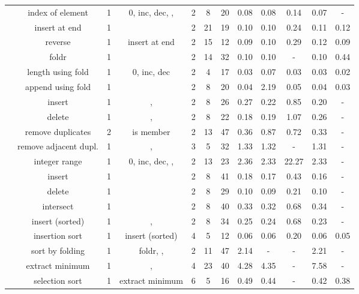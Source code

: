 \documentclass[10pt,preprint]{sigplanconf-pldi16}
\theoremstyle{definition}
\begin{document}
\begin{table*}[!htbp]
\begin{center}
{\begin{tabular}{@{} r|c| cccc | cccccc @{}}
 & index of element & 1 & 0, inc, dec, ,  & 2 & 8 & 20 & 0.08 & 0.08 & 0.14 & 0.07 & - \\
 & insert at end & 1 &  & 2 & 21 & 19 & 0.10 & 0.10 & 0.24 & 0.11 & 0.12 \\
 & reverse & 1 & insert at end & 2 & 15 & 12 & 0.09 & 0.10 & 0.29 & 0.12 & 0.09 \\
 & foldr & 1 &  & 2 & 14 & 32 & 0.10 & 0.10 & - & 0.10 & 0.44 \\
 & length using fold & 1 & 0, inc, dec & 2 & 4 & 17 & 0.03 & 0.07 & 0.03 & 0.03 & 0.02 \\
 & append using fold & 1 &  & 2 & 8 & 20 & 0.04 & 2.19 & 0.05 & 0.04 & 0.03 \\
\hline\multirow{5}{*}{\parbox{1cm}{\vspace{-0.85\baselineskip}}} & insert & 1 & ,  & 2 & 8 & 26 & 0.27 & 0.22 & 0.85 & 0.20 & - \\
 & delete & 1 & ,  & 2 & 8 & 22 & 0.18 & 0.19 & 1.07 & 0.26 & - \\
 & remove duplicates & 2 & is member & 2 & 13 & 47 & 0.36 & 0.87 & 0.72 & 0.33 & - \\
 & remove adjacent dupl. & 1 & ,  & 3 & 5 & 32 & 1.33 & 1.32 & - & 1.31 & - \\
 & integer range & 1 & 0, inc, dec, ,  & 2 & 13 & 23 & 2.36 & 2.33 & 22.27 & 2.33 & - \\
\hline\multirow{3}{*}{\parbox{1cm}{\vspace{-0.85\baselineskip}}} & insert & 1 &  & 2 & 8 & 41 & 0.18 & 0.17 & 0.43 & 0.16 & - \\
 & delete & 1 &  & 2 & 8 & 29 & 0.10 & 0.09 & 0.21 & 0.10 & - \\
 & intersect & 1 &  & 2 & 8 & 40 & 0.33 & 0.32 & 0.68 & 0.34 & - \\
\hline\multirow{11}{*}{\parbox{1cm}{\vspace{-0.85\baselineskip}}} & insert (sorted) & 1 & ,  & 2 & 8 & 34 & 0.25 & 0.24 & 0.68 & 0.23 & - \\
 & insertion sort & 1 & insert (sorted) & 4 & 5 & 12 & 0.06 & 0.06 & 0.20 & 0.06 & 0.05 \\
 & sort by folding & 1 & foldr, ,  & 2 & 11 & 47 & 2.14 & - & - & 2.21 & - \\
 & extract minimum & 1 & ,  & 4 & 23 & 40 & 4.28 & 4.35 & - & 7.58 & - \\
 & selection sort & 1 & extract minimum & 6 & 5 & 16 & 0.49 & 0.44 & - & 0.42 & 0.38 \\

\end{tabular}}
\end{center}
\end{table*}
\end{document}
